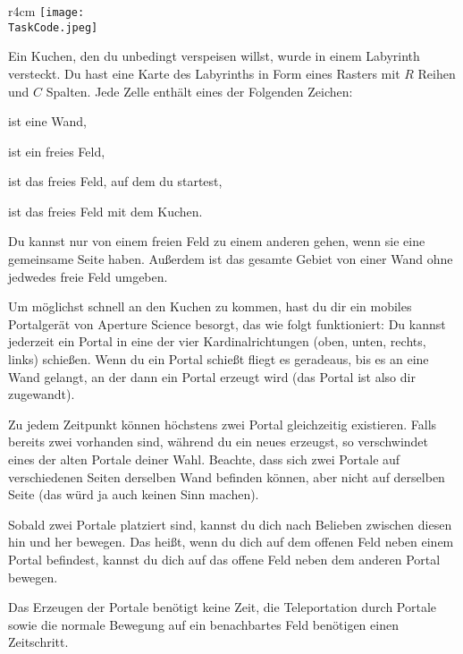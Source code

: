 \documentclass{boi2014-de}
\renewcommand{\TaskCode}{portals}
\newcommand{\constant}[1]{{\tt #1}}
\begin{document}
    \begin{wrapfigure}[4]{r}{4cm}
        \vspace{-24pt}
		\texttt{[image: \\TaskCode.jpeg]}
	\end{wrapfigure}
	
    Ein Kuchen, den du unbedingt verspeisen willst, wurde in einem Labyrinth versteckt. Du hast eine Karte des Labyrinths in Form eines Rasters mit $R$ Reihen und $C$ Spalten. Jede Zelle enthält eines der Folgenden Zeichen:
    \begin{description}[itemindent=1pt]
    	\item[\constant{\#}] ist eine Wand,
        \item[\constant{.}] ist ein freies Feld,
        \item[\constant{S}] ist das freies Feld, auf dem du startest,
        \item[\constant{C}] ist das freies Feld mit dem Kuchen.
    \end{description}
    
    Du kannst nur von einem freien Feld zu einem anderen gehen, wenn sie eine gemeinsame Seite haben. Außerdem ist das gesamte Gebiet von einer Wand ohne jedwedes freie Feld umgeben.
    
    Um möglichst schnell an den Kuchen zu kommen, hast du dir ein mobiles Portalgerät von Aperture Science\texttrademark{} besorgt, das wie folgt funktioniert:
    Du kannst jederzeit ein Portal in eine der vier Kardinalrichtungen (oben, unten, rechts, links) schießen. Wenn du ein Portal schießt fliegt es geradeaus, bis es an eine Wand gelangt, an der dann ein Portal erzeugt wird (das Portal ist also dir zugewandt).
    
    Zu jedem Zeitpunkt können höchstens zwei Portal gleichzeitig existieren. Falls bereits zwei vorhanden sind, während du ein neues erzeugst, so verschwindet eines der alten Portale deiner Wahl. Beachte, dass sich zwei Portale auf verschiedenen Seiten derselben Wand befinden können, aber nicht auf derselben Seite (das würd ja auch keinen Sinn machen).
    
    Sobald zwei Portale platziert sind, kannst du dich nach Belieben zwischen diesen hin und her bewegen. Das heißt, wenn du dich auf dem offenen Feld neben einem Portal befindest, kannst du dich auf das offene Feld neben dem anderen Portal bewegen. %
    
    Das Erzeugen der Portale benötigt keine Zeit, die Teleportation durch Portale sowie die normale Bewegung auf ein benachbartes Feld benötigen einen Zeitschritt.
\end{document}
